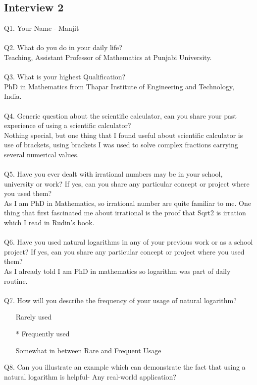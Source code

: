 \documentclass{article}
\makeatletter
\newcommand*{\radiobutton}{%
  \@ifstar{\@radiobutton0}{\@radiobutton1}%
}
\newcommand*{\@radiobutton}[1]{%
  \begin{tikzpicture}
    \pgfmathsetlengthmacro\radius{height("X")/2}
    \draw[radius=\radius] circle;
    \ifcase#1 \fill[radius=.6*\radius] circle;\fi
  \end{tikzpicture}%
}
\makeatother
\begin{document}
\subsection{Interview 2}
Q1. Your Name -  Manjit\\\\
Q2. What do you do in your daily life?\\
Teaching, Assistant Professor of Mathematics at Punjabi University.\\\\
Q3. What is your highest Qualification?\\
PhD in Mathematics from Thapar Institute of Engineering and Technology, India.\\\\
Q4. Generic question about the scientific calculator, can you share your past experience of using a scientific calculator?\\
Nothing special, but one thing that I found useful about scientific calculator is use of brackets, using brackets I was used to solve complex fractions carrying several numerical values.\\\\
Q5. Have you ever dealt with irrational numbers may be in your school, university or work? If yes, can you share any particular concept or project where you used them?\\
As I am PhD in Mathematics, so irrational number are quite familiar to me. One thing that first fascinated me about irrational is the proof that Sqrt{2} is irration which I read in Rudin's book.\\\\
Q6. Have you used natural logarithms in any of your previous work or as a school project? If yes, can you share any particular concept or project where you used them?\\
As I already told I am PhD in mathematics so logarithm was part of daily routine.\\\\
Q7. How will you describe the frequency of your usage of natural logarithm?
\begin{itemize}
\item[\radiobutton] Rarely used
\item[\radiobutton*] Frequently used
\item[\radiobutton] Somewhat in between Rare and Frequent Usage
\end{itemize}
Q8. Can you illustrate an example which can demonstrate the fact that using a natural logarithm is helpful- Any real-world application?\\
\end{document}
